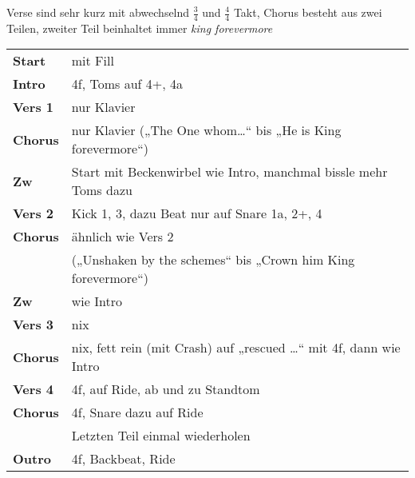 
Verse sind sehr kurz mit abwechselnd $\frac{3}{4}$ und $\frac{4}{4}$ Takt, Chorus besteht aus zwei Teilen, zweiter Teil beinhaltet immer \textit{king forevermore}
\begin{tabular}{p{1.6cm}l}
	\textbf{Start}  & mit Fill                                                          \\
	\textbf{Intro}  & 4f, Toms auf 4+, 4a                                               \\
	\textbf{Vers 1} & nur Klavier                                                       \\
	\textbf{Chorus} & nur Klavier („The One whom…“ bis „He is King forevermore“)        \\
	\textbf{Zw}     & Start mit Beckenwirbel wie Intro, manchmal bissle mehr Toms dazu  \\
	\textbf{Vers 2} & Kick 1, 3, dazu Beat nur auf Snare 1a, 2+, 4                      \\
	\textbf{Chorus} & ähnlich wie Vers 2                                                \\
	                & („Unshaken by the schemes“ bis „Crown him King forevermore“)      \\
	\textbf{Zw}     & wie Intro                                                         \\
	\textbf{Vers 3} & nix                                                               \\
	\textbf{Chorus} & nix, fett rein (mit Crash) auf „rescued …“ mit 4f, dann wie Intro \\
	\textbf{Vers 4} & 4f, auf Ride, ab und zu Standtom                                  \\
	\textbf{Chorus} & 4f, Snare dazu auf Ride                                           \\
	                & Letzten Teil einmal wiederholen                                   \\
	\textbf{Outro}  & 4f, Backbeat, Ride                                                \\
\end{tabular}